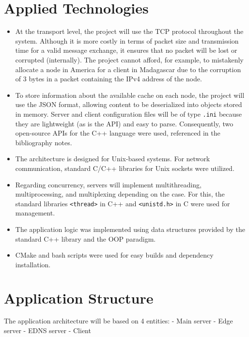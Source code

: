 \documentclass[runningheads]{llncs}
\begin{document}
\section{Applied Technologies}
\begin{itemize}
    \item At the transport level, the project will use the TCP protocol throughout the system. Although it is more costly in terms of packet size and transmission time for a valid message exchange, it ensures that no packet will be lost or corrupted (internally). The project cannot afford, for example, to mistakenly allocate a node in America for a client in Madagascar due to the corruption of 3 bytes in a packet containing the IPv4 address of the node.
    
    \item To store information about the available cache on each node, the project will use the JSON format, allowing content to be deserialized into objects stored in memory. Server and client configuration files will be of type \texttt{.ini} because they are lightweight (as is the API) and easy to parse. Consequently, two open-source APIs for the C++ language were used, referenced in the bibliography notes.

    \item The architecture is designed for Unix-based systems. For network communication, standard C/C++ libraries for Unix sockets were utilized.

    \item Regarding concurrency, servers will implement multithreading, multiprocessing, and multiplexing depending on the case. For this, the standard libraries \texttt{<thread>} in C++ and \texttt{<unistd.h>} in C were used for management.
    
    \item The application logic was implemented using data structures provided by the standard C++ library and the OOP paradigm.
    
    \item CMake and bash scripts were used for easy builds and dependency installation.

\end{itemize}

\section{Application Structure}
The application architecture will be based on 4 entities: 
- Main server 
- Edge server
- EDNS server
- Client
\end{document}
